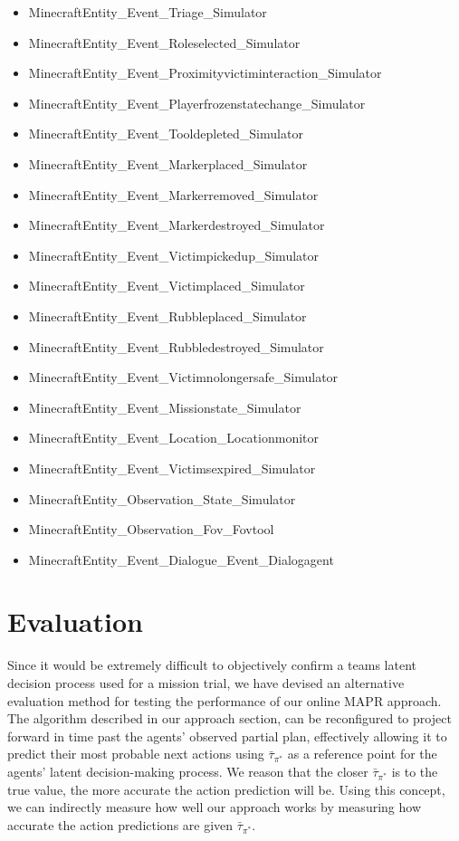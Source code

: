 \begin{itemize}
\item MinecraftEntity_Event_Triage_Simulator
\item MinecraftEntity_Event_Roleselected_Simulator
\item MinecraftEntity_Event_Proximityvictiminteraction_Simulator
\item MinecraftEntity_Event_Playerfrozenstatechange_Simulator
\item MinecraftEntity_Event_Tooldepleted_Simulator
\item MinecraftEntity_Event_Markerplaced_Simulator
\item MinecraftEntity_Event_Markerremoved_Simulator
\item MinecraftEntity_Event_Markerdestroyed_Simulator
\item MinecraftEntity_Event_Victimpickedup_Simulator
\item MinecraftEntity_Event_Victimplaced_Simulator
\item MinecraftEntity_Event_Rubbleplaced_Simulator
\item MinecraftEntity_Event_Rubbledestroyed_Simulator
\item MinecraftEntity_Event_Victimnolongersafe_Simulator
\item MinecraftEntity_Event_Missionstate_Simulator
\item MinecraftEntity_Event_Location_Locationmonitor
\item MinecraftEntity_Event_Victimsexpired_Simulator
\item MinecraftEntity_Observation_State_Simulator
\item MinecraftEntity_Observation_Fov_Fovtool
\item MinecraftEntity_Event_Dialogue_Event_Dialogagent
\end{itemize}

\section{Evaluation}
Since it would be extremely difficult to objectively confirm a teams latent decision process used for a mission trial, we have devised an alternative evaluation method for testing the performance of our online MAPR approach. The algorithm described in our approach section, can be reconfigured to project forward in time past the agents' observed partial plan, effectively allowing it to predict their most probable next actions using $\bar{\tau}_{\pi^*}$ as a reference point for the agents' latent decision-making process. We reason that the closer $\bar{\tau}_{\pi^*}$ is to the true value, the more accurate the action prediction will be. Using this concept, we can indirectly measure how well our approach works by measuring how accurate the action predictions are given $\bar{\tau}_{\pi^*}$.

